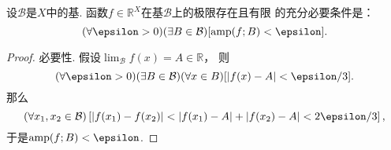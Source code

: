 \begin{theorem}
设\(\mathcal{B}\)是\(X\)中的基.
函数\(f\in\mathbb{R}^X\)在基\(\mathcal{B}\)上的极限存在且有限 的充分必要条件是：\begin{equation*}
	(\forall\epsilon>0)
	(\exists B\in\mathcal{B})
	[\amp(f;B)<\epsilon].
\end{equation*}
\begin{proof}
必要性.
假设\(\lim_\mathcal{B} f(x) = A \in \mathbb{R}\)，
则\begin{equation*}
	(\forall\epsilon>0)
	(\exists B\in\mathcal{B})
	(\forall x\in B)
	[
		\abs{f(x)-A}<\epsilon/3
	].
\end{equation*}
那么\begin{equation*}
	(\forall x_1,x_2\in\mathcal{B})
	\left[
		\abs{f(x_1)-f(x_2)}
		< \abs{f(x_1)-A}+\abs{f(x_2)-A}
		< 2\epsilon/3
	\right],
\end{equation*}
于是\(\amp(f;B)<\epsilon\).


\end{proof}
\end{theorem}
